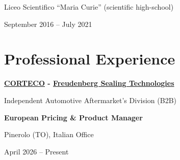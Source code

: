 \documentclass[10pt,a4paper]{article}
\begin{document}
\par
Liceo Scientifico “Maria Curie” (scientific high-school)

\par
September 2016 -- July 2021

\vspace{12pt}


\section*{Professional Experience}

\vspace{8pt}

\textbf{\href{https://www.corteco.com/}{CORTECO}
-
\href{https://www.freudenberg.com/en}{Freudenberg Sealing Technologies}
}

\par
Independent Automotive Aftermarket's Division (B2B)

\vspace{2pt}


\textbf{European Pricing \& Product Manager}

\par
Pinerolo (TO), Italian Office

\par
April 2026 -- Present


\vspace{3pt}

\end{document}
